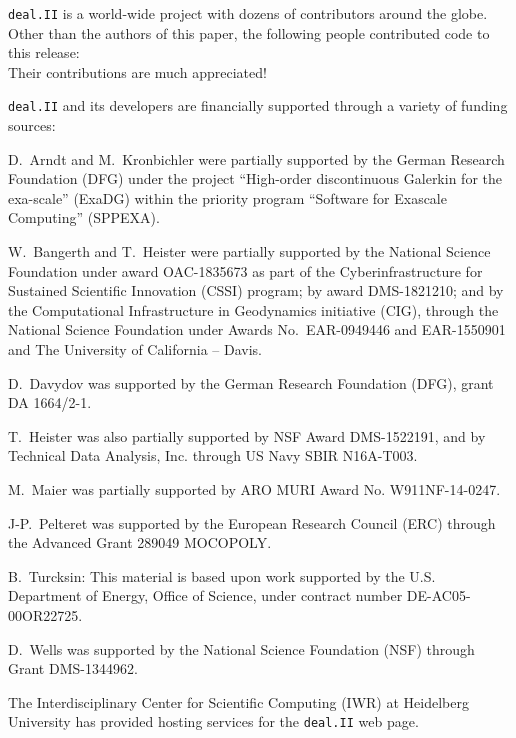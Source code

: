 \documentclass{ansarticle-preprint}
\newcommand{\specialword}[1]{\texttt{#1}}
\newcommand{\dealii}{{\specialword{deal.II}}\xspace}
\begin{document}
\dealii is a world-wide project with dozens of contributors around the
globe. Other than the authors of this paper, the following people contributed code to
this release:\\
%
%


Their contributions are much appreciated!


\bigskip

\dealii and its developers are financially supported through a
variety of funding sources:

D.~Arndt and M.~Kronbichler were partially supported by the German
Research Foundation (DFG) under the project ``High-order discontinuous
Galerkin for the exa-scale'' (\mbox{ExaDG}) within the priority program ``Software
for Exascale Computing'' (SPPEXA).

W.~Bangerth and T.~Heister were partially
supported by the National Science Foundation under award OAC-1835673
as part of the Cyberinfrastructure for Sustained Scientific Innovation (CSSI)
program; by award DMS-1821210; and by the Computational Infrastructure
in Geodynamics initiative (CIG), through the National Science
Foundation under Awards No.~EAR-0949446 and EAR-1550901 and The
University of California -- Davis.

D.~Davydov was supported by the German Research Foundation (DFG), grant DA
1664/2-1.

T.~Heister was also partially supported by NSF Award DMS-1522191, and
by Technical Data Analysis, Inc. through US Navy SBIR N16A-T003.

M.~Maier was partially supported by ARO MURI Award No. W911NF-14-0247.

J-P.~Pelteret was supported by the European Research Council (ERC) through
the Advanced Grant 289049 MOCOPOLY.

B.~Turcksin: This material is based upon work supported by the U.S.
Department of Energy, Office of Science, under contract number
DE-AC05-00OR22725.

D.~Wells was supported by the National Science Foundation (NSF) through Grant
DMS-1344962.

The Interdisciplinary Center for Scientific Computing (IWR) at Heidelberg
University has provided hosting services for the \dealii web page.


{}

\end{document}
